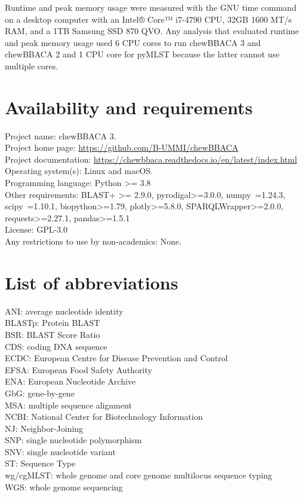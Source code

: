 Runtime and peak memory usage were measured with the GNU time command on a desktop computer with an Intel® Core™ i7-4790 CPU, 32GB 1600 MT/s RAM, and a 1TB Samsung SSD 870 QVO. Any analysis that evaluated runtime and peak memory usage used 6 CPU cores to run chewBBACA 3 and chewBBACA 2 and 1 CPU core for pyMLST because the latter cannot use multiple cores.

\section{Availability and requirements} \label{sec:availability_and_requirements}

\noindent Project name: chewBBACA 3.\\
Project home page: \url{https://github.com/B-UMMI/chewBBACA}\\
Project documentation: \url{https://chewbbaca.readthedocs.io/en/latest/index.html}\\
Operating system(s): Linux and macOS.\\
Programming language: Python >= 3.8\\
Other requirements: BLAST+ >= 2.9.0, pyrodigal>=3.0.0, numpy~=1.24.3, scipy~=1.10.1, biopython>=1.79, plotly>=5.8.0, SPARQLWrapper>=2.0.0, requests>=2.27.1, pandas>=1.5.1\\
License: GPL-3.0\\
Any restrictions to use by non-academics: None.

\section{List of abbreviations} \label{sec:list_of_abbreviations}

\noindent ANI: average nucleotide identity\\
BLASTp: Protein BLAST\\
BSR: BLAST Score Ratio\\
CDS: coding DNA sequence\\
ECDC: European Centre for Disease Prevention and Control\\
EFSA: European Food Safety Authority\\
ENA: European Nucleotide Archive\\
GbG: gene-by-gene\\
MSA: multiple sequence alignment\\
NCBI: National Center for Biotechnology Information\\
NJ: Neighbor-Joining\\
SNP: single nucleotide polymorphism\\
SNV: single nucleotide variant\\
ST: Sequence Type\\
wg/cgMLST: whole genome and core genome multilocus sequence typing\\
WGS: whole genome sequencing

